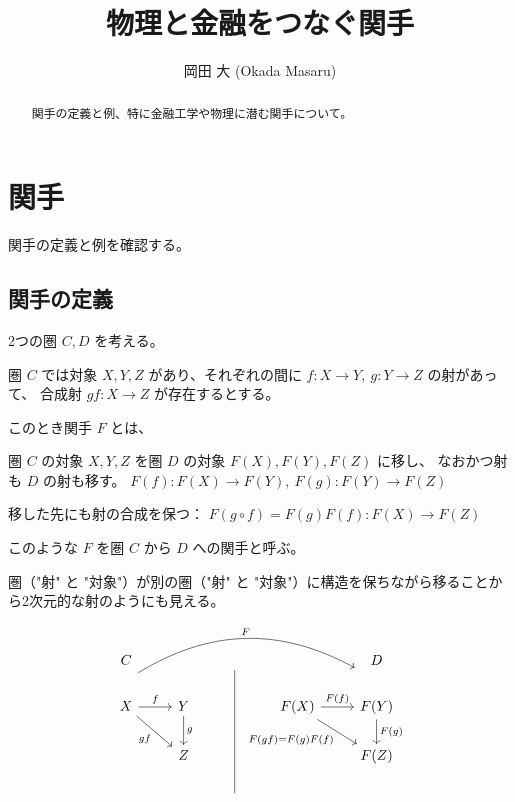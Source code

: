 \documentclass[uplatex,a4j,12pt,dvipdfmx]{jsarticle}
\title{
物理と金融をつなぐ関手
}
\author{
岡田 大 (Okada Masaru)
}
\begin{document}
\maketitle

\begin{abstract}
	関手の定義と例、特に金融工学や物理に潜む関手について。
\end{abstract}


\section{関手}

関手の定義と例を確認する。

\subsection{関手の定義}

2つの圏 $C,D$ を考える。

圏 $C$ では対象 $X,Y,Z$ があり、それぞれの間に
$f: X \to Y , \ g: Y \to Z$
の射があって、
合成射
$gf: X \to  Z$
が存在するとする。

このとき関手 $F$ とは、

圏 $C$ の対象 $X,Y,Z$ を圏 $D$ の対象 $F(X),F(Y),F(Z)$ に移し、
なおかつ射も $D$ の射も移す。
$F(f): F(X) \to F(Y) , \ F(g): F(Y) \to F(Z)$

移した先にも射の合成を保つ：
$F(g \circ f) = F(g) F(f): F(X) \to F(Z)$

このような $F$ を圏 $C$ から $D$ への関手と呼ぶ。

圏（"射" と "対象"）が別の圏（"射" と "対象"）に構造を保ちながら移ることから2次元的な射のようにも見える。

\[
	\begin{tikzcd}
		C                                                                             &                  & {}                      &                                                        & D                      \\
		X \arrow[r, "f"] \arrow[rd, "gf"'] \arrow[rrrr, "F", bend left, shift left=8] & Y \arrow[d, "g"] &                         & F(X) \arrow[r, "F(f)"] \arrow[rd, "F(gf) = F(g)F(f)"'] & F(Y) \arrow[d, "F(g)"] \\
		& Z                &                         &                                                        & F(Z)                   \\
		&                  & {} \arrow[uuu, no head] &                                                        &
	\end{tikzcd}
\]
\end{document}
